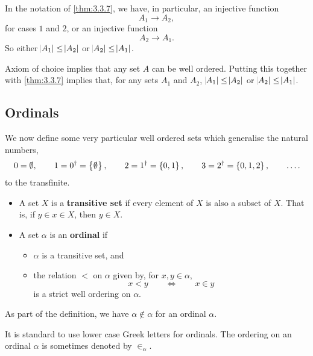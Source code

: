 
\begin{remark*}
In the notation of \ref{thm:3.3.7}, we have, in particular, an injective function
$$ A_1 \to A_2, $$
for cases $ 1 $ and $ 2 $, or an injective function
$$ A_2 \to A_1. $$
So either $ \abs{A_1} \le \abs{A_2} $ or $ \abs{A_2} \le \abs{A_1} $.
\end{remark*}

Axiom of choice implies that any set $ A $ can be well ordered. Putting this together with \ref{thm:3.3.7} implies that, for any sets $ A_1 $ and $ A_2 $, $ \abs{A_1} \le \abs{A_2} $ or $ \abs{A_2} \le \abs{A_1} $.

\pagebreak

\subsection{Ordinals}

We now define some very particular well ordered sets which generalise the natural numbers,
$$ 0 = \emptyset, \qquad 1 = 0^\dagger = \cbr{\emptyset}, \qquad 2 = 1^\dagger = \cbr{0, 1}, \qquad 3 = 2^\dagger = \cbr{0, 1, 2}, \qquad \dots. $$
to the transfinite.

\begin{definition}
\hfill
\begin{itemize}
\item A set $ X $ is a \textbf{transitive set} if every element of $ X $ is also a subset of $ X $. That is, if $ y \in x \in X $, then $ y \in X $.
\item A set $ \alpha $ is an \textbf{ordinal} if
\begin{itemize}
\item $ \alpha $ is a transitive set, and
\item the relation $ < $ on $ \alpha $ given by, for $ x, y \in \alpha $,
$$ x < y \qquad \iff \qquad x \in y $$
is a strict well ordering on $ \alpha $.
\end{itemize}
\end{itemize}
\end{definition}

\begin{note*}
As part of the definition, we have $ \alpha \notin \alpha $ for an ordinal $ \alpha $.
\end{note*}

It is standard to use lower case Greek letters for ordinals. The ordering on an ordinal $ \alpha $ is sometimes denoted by $ \in_\alpha $.

